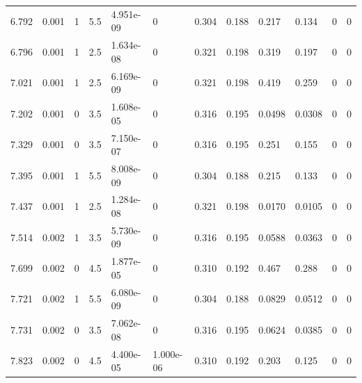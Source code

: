 \documentclass[preview]{standalone}
\begin{document}
{{\begin{tabular}{L{1.2cm}C{1.2cm} C{0.3cm}C{0.5cm} C{1.4cm}C{1.4cm} C{1.4cm}C{1.4cm} C{1.6cm}C{1.6cm} C{1.6cm}C{1.6cm}}
  6.792  &  0.001  & 1     & 5.5 &  4.951e-09  & 0  &  0.304&   0.188& 0.217 & 0.134   &  0 & 0  \\ 
  6.796  &  0.001  & 1     & 2.5 &  1.634e-08  & 0  &  0.321&   0.198& 0.319 & 0.197   &  0 & 0  \\ 
  7.021  &  0.001  & 1     & 2.5 &  6.169e-09  & 0  &  0.321&   0.198& 0.419 & 0.259   &  0 & 0  \\ 
  7.202  &  0.001  & 0     & 3.5 &  1.608e-05  & 0  &  0.316&   0.195& 0.0498 & 0.0308   &  0 & 0  \\ 
  7.329  &  0.001  & 0     & 3.5 &  7.150e-07  & 0  &  0.316&   0.195& 0.251 & 0.155   &  0 & 0  \\ 
  7.395  &  0.001  & 1     & 5.5 &  8.008e-09  & 0  &  0.304&   0.188& 0.215 & 0.133   &  0 & 0  \\ 
  7.437  &  0.001  & 1     & 2.5 &  1.284e-08  & 0  &  0.321&   0.198& 0.0170 & 0.0105   &  0 & 0  \\ 
  7.514  &  0.002  & 1     & 3.5 &  5.730e-09  & 0  &  0.316&   0.195& 0.0588 & 0.0363   &  0 & 0  \\ 
  7.699  &  0.002  & 0     & 4.5 &  1.877e-05  & 0  &  0.310&   0.192& 0.467 & 0.288   &  0 & 0  \\ 
  7.721  &  0.002  & 1     & 5.5 &  6.080e-09  & 0  &  0.304&   0.188& 0.0829 & 0.0512   &  0 & 0  \\ 
  7.731  &  0.002  & 0     & 3.5 &  7.062e-08  & 0  &  0.316&   0.195& 0.0624 & 0.0385   &  0 & 0  \\ 
  7.823  &  0.002  & 0     & 4.5 &  4.400e-05  & 1.000e-06  &  0.310&   0.192& 0.203 & 0.125   &  0 & 0  \\ 
\hline 
\end{tabular} 

}}
\end{document}
